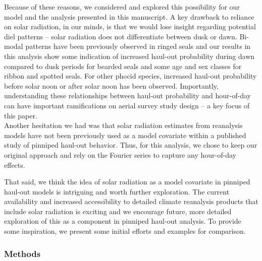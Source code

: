 \documentclass[fleqn,10pt,lineno]{wlpeerj} %
\begin{document}
Because of these reasons, we considered and explored this
possibility for our model and the analysis presented in this manuscript. A key
drawback to reliance on solar radiation, in our minds, is that we would lose
insight regarding potential diel patterns -- solar radiation does not
differentiate between dusk or dawn. Bi-modal patterns have been
previously observed in ringed seals and our results in this analysis show some indication of
increased haul-out probability during dawn compared to dusk periods for bearded seals
and some age and sex classes for ribbon and spotted seals.
For other phocid species, increased haul-out probability before solar noon or after
solar noon has been observed. Importantly, understanding these relationships
between haul-out probability and hour-of-day can have important ramifications
on aerial survey study design -- a key focus of this paper.\\
Another hesitation we had was that solar radiation estimates from reanalysis models have
not been previously used as a model covariate within a published study of
pinniped haul-out behavior. Thus, for this analysis, we chose to keep our
original approach and rely on the Fourier series to capture any hour-of-day
effects.

That said, we think the idea of solar radiation as a model covariate in pinniped
haul-out models is intriguing and worth further exploration. The current
availability and increased accessibility to detailed climate reanalysis
products that include solar radiation is exciting and we encourage future, more
detailed exploration of this as a component in pinniped haul-out analysis. To
provide some inspiration, we present some initial efforts and examples for
comparison.

\subsubsection{Methods}\label{methods-1}
\end{document}
